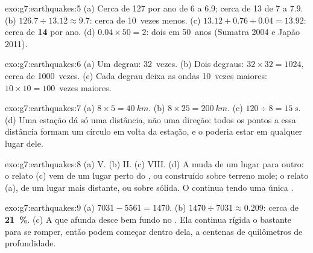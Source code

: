 \begin{solution}{exo:g7:earthquakes:5}
(a) Cerca de 127 por ano de  6 a 6.9; cerca de 13 de  7
a 7.9. (b) $126.7 \div 13.12 \approx 9.7$: cerca de 10~vezes menos. (c)
$13.12 + 0.76 + 0.04 = 13.92$: cerca de \textbf{14} por ano. (d)
$0.04 \times 50 = 2$: dois em 50~anos (Sumatra 2004 e Japão 2011).
\end{solution}

\begin{solution}{exo:g7:earthquakes:6}
(a) Um degrau: 32~vezes. (b) Dois degraus: $32 \times 32 = 1024$, cerca
de 1000~vezes. (c) Cada degrau deixa as ondas 10~vezes maiores: $10 \times 10 =
100$~vezes maiores.
\end{solution}

\begin{solution}{exo:g7:earthquakes:7}
(a) $8 \times 5 = \qty{40}{km}$. (b) $8 \times 25 = \qty{200}{km}$. (c)
$120 \div 8 = \qty{15}{s}$. (d) Uma estação dá só uma distância, não uma
direção: todos os pontos a essa distância formam um círculo em volta da
estação, e o  poderia estar em qualquer lugar dele.
\end{solution}

\begin{solution}{exo:g7:earthquakes:8}
(a) V. (b) II. (c) VIII. (d) A  muda de um lugar para outro: o
relato (c) vem de um lugar perto do , ou construído sobre
terreno mole; o relato (a), de um lugar mais distante, ou sobre 
sólida. O  continua tendo uma única .
\end{solution}

\begin{solution}{exo:g7:earthquakes:9}
(a) $7031 - 5561 = 1470$. (b) $1470 \div 7031 \approx 0.209$: cerca de
\textbf{21~\%}. (c) A  que afunda desce bem fundo no . Ela
continua rígida o bastante para se romper, então  podem começar
dentro dela, a centenas de quilômetros de profundidade.
\end{solution}

